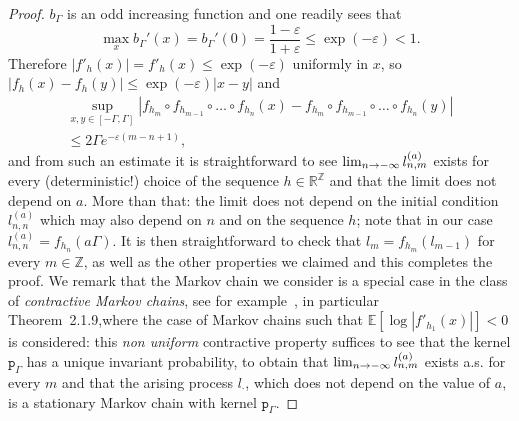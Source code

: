 \documentclass[AHL,Unicode,longabstracts,published]{cedram}
\newcommand{\pp}{\mathtt{p}_\gG}
\newcommand{\bbE}{\mathbb{E}}
\newcommand{\bbR}{\mathbb{R}}
\newcommand{\bbZ}{\mathbb{Z}}
\newcommand{\gep}{\varepsilon}
\newcommand{\gG}{\Gamma}
\renewcommand*{\to}{\mathchoice{\longrightarrow}{\rightarrow}{\rightarrow}{\rightarrow}}
\begin{document}
\begin{proof}
$b_\gG$ is an odd increasing function and one readily sees that
\begin{equation}
\max_x b_\gG' (x)= b_\gG' (0)= \frac{1-\gep}{1+ \gep}\le \exp(-\gep) <1.
\end{equation}
Therefore $| f'_h(x)|= f'_h(x)\!\le\! \exp(-\gep)$ uniformly in $x$, so $| f_h(x)-f_h(y)| \!\le\! \exp(-\gep) | x-y |$ and
\begin{multline}\label{eq:17JLct}
\sup_{x, y \in [-\gG, \gG]}
\left|f_{h_{m}} \circ f_{h_{m-1}} \circ \dots \circ f_{h_n} \left(x\right)- f_{h_{m}} \circ f_{h_{m-1}} \circ \dots \circ f_{h_n} (y)\right|\\
\le 2 \gG e^{-\gep (m-n+1)},
\end{multline}
and from such an estimate it is straightforward to see $\lim_{n \to -\infty} l^{(a)}_{n, m}$ exists for every (deterministic!) choice of the sequence $h\in \bbR^\bbZ$ and that the limit does not depend on $a$. More than that: the limit does not depend on the initial condition $l^{(a)}_{n, n}$ which may also depend on $n$ and on the sequence $h$; note that in our case $l^{(a)}_{n, n}=f_{h_n}(a \gG)$. It is then straightforward to check that $l_{m}=f_{h_m}(l_{m-1})$ for every $m\in\bbZ$, as well as the other properties we claimed and this completes the proof. We remark that the Markov chain we consider is a special case in the class of \emph{contractive Markov chains}, see for example~\cite[Chapter~2]{cf:MC}, in particular Theorem~2.1.9,\linebreak where the case of Markov chains such that $\bbE[\log |f'_{h_1}(x)|] <0$ is considered: this \emph{non uniform} contractive property suffices to see that the kernel $\pp$ has a unique invariant probability, to obtain that $\lim_{n \to -\infty} l^{(a)}_{n, m}$ exists a.s. for every $m$ and that the arising process $l_\cdot$, which does not depend on the value of $a$, is a stationary Markov chain with kernel $\pp$.
\end{proof}
\end{document}
